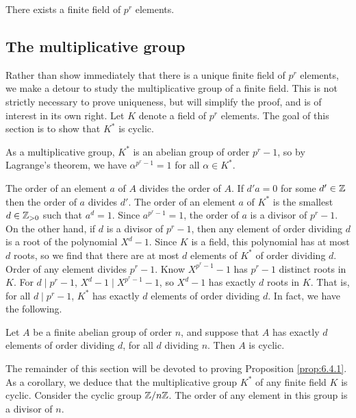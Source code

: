 \begin{corollary}
There exists a finite field of $ p^r $ elements.
\end{corollary}

\subsection{The multiplicative group}


Rather than show immediately that there is a unique finite field of $ p^r $ elements, we make a detour to study the multiplicative group of a finite field. This is not strictly necessary to prove uniqueness, but will simplify the proof, and is of interest in its own right. Let $ K $ denote a field of $ p^r $ elements. The goal of this section is to show that $ K^* $ is cyclic.

\begin{note*}
As a multiplicative group, $ K^* $ is an abelian group of order $ p^r - 1 $, so by Lagrange's theorem, we have $ \alpha^{p^r - 1} = 1 $ for all $ \alpha \in K^* $.
\end{note*}

The order of an element $ a $ of $ A $ divides the order of $ A $. If $ d'a = 0 $ for some $ d' \in \mathbb{Z} $ then the order of $ a $ divides $ d' $. The order of an element $ a $ of $ K^* $ is the smallest $ d \in \mathbb{Z}_{> 0} $ such that $ a^d = 1 $. Since $ a^{p^r - 1} = 1 $, the order of $ a $ is a divisor of $ p^r - 1 $. On the other hand, if $ d $ is a divisor of $ p^r - 1 $, then any element of order dividing $ d $ is a root of the polynomial $ X^d - 1 $. Since $ K $ is a field, this polynomial has at most $ d $ roots, so we find that there are at most $ d $ elements of $ K^* $ of order dividing $ d $. Order of any element divides $ p^r - 1 $. Know $ X^{p^r - 1} - 1 $ has $ p^r - 1 $ distinct roots in $ K $. For $ d \mid p^r - 1 $, $ X^d - 1 \mid X^{p^r - 1} - 1 $, so $ X^d - 1 $ has exactly $ d $ roots in $ K $. That is, for all $ d \mid p^r - 1 $, $ K^* $ has exactly $ d $ elements of order dividing $ d $. In fact, we have the following.

\begin{proposition}
\label{prop:6.4.1}
Let $ A $ be a finite abelian group of order $ n $, and suppose that $ A $ has exactly $ d $ elements of order dividing $ d $, for all $ d $ dividing $ n $. Then $ A $ is cyclic.
\end{proposition}

The remainder of this section will be devoted to proving Proposition \ref{prop:6.4.1}. As a corollary, we deduce that the multiplicative group $ K^* $ of any finite field $ K $ is cyclic. Consider the cyclic group $ \mathbb{Z} / n\mathbb{Z} $. The order of any element in this group is a divisor of $ n $.

